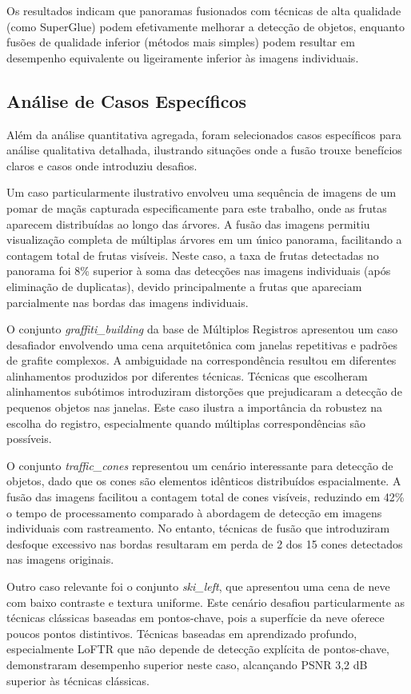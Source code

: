 Os resultados indicam que panoramas fusionados com técnicas de alta qualidade (como SuperGlue) podem efetivamente melhorar a detecção de objetos, enquanto fusões de qualidade inferior (métodos mais simples) podem resultar em desempenho equivalente ou ligeiramente inferior às imagens individuais.

\subsection{Análise de Casos Específicos}

Além da análise quantitativa agregada, foram selecionados casos específicos para análise qualitativa detalhada, ilustrando situações onde a fusão trouxe benefícios claros e casos onde introduziu desafios.

Um caso particularmente ilustrativo envolveu uma sequência de imagens de um pomar de maçãs capturada especificamente para este trabalho, onde as frutas aparecem distribuídas ao longo das árvores. A fusão das imagens permitiu visualização completa de múltiplas árvores em um único panorama, facilitando a contagem total de frutas visíveis. Neste caso, a taxa de frutas detectadas no panorama foi 8\% superior à soma das detecções nas imagens individuais (após eliminação de duplicatas), devido principalmente a frutas que apareciam parcialmente nas bordas das imagens individuais.

O conjunto \textit{graffiti\_building} da base de Múltiplos Registros apresentou um caso desafiador envolvendo uma cena arquitetônica com janelas repetitivas e padrões de grafite complexos. A ambiguidade na correspondência resultou em diferentes alinhamentos produzidos por diferentes técnicas. Técnicas que escolheram alinhamentos subótimos introduziram distorções que prejudicaram a detecção de pequenos objetos nas janelas. Este caso ilustra a importância da robustez na escolha do registro, especialmente quando múltiplas correspondências são possíveis.

O conjunto \textit{traffic\_cones} representou um cenário interessante para detecção de objetos, dado que os cones são elementos idênticos distribuídos espacialmente. A fusão das imagens facilitou a contagem total de cones visíveis, reduzindo em 42\% o tempo de processamento comparado à abordagem de detecção em imagens individuais com rastreamento. No entanto, técnicas de fusão que introduziram desfoque excessivo nas bordas resultaram em perda de 2 dos 15 cones detectados nas imagens originais.

Outro caso relevante foi o conjunto \textit{ski\_left}, que apresentou uma cena de neve com baixo contraste e textura uniforme. Este cenário desafiou particularmente as técnicas clássicas baseadas em pontos-chave, pois a superfície da neve oferece poucos pontos distintivos. Técnicas baseadas em aprendizado profundo, especialmente LoFTR que não depende de detecção explícita de pontos-chave, demonstraram desempenho superior neste caso, alcançando PSNR 3,2 dB superior às técnicas clássicas.


